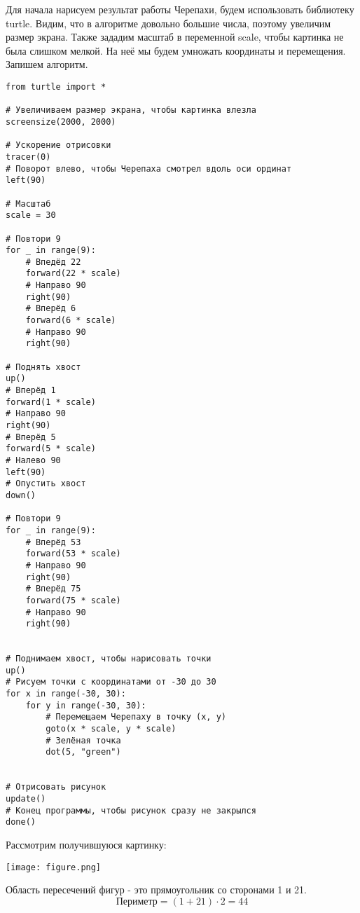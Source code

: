 \documentclass[14pt,a4paper]{article}
\begin{document}
Для начала нарисуем результат работы Черепахи, будем использовать
библиотеку turtle. Видим, что в алгоритме довольно большие числа,
поэтому увеличим размер экрана. Также зададим масштаб в переменной
scale, чтобы картинка не была слишком мелкой. На неё мы будем
умножать координаты и перемещения. Запишем алгоритм.

\begin{verbatim}
from turtle import *

# Увеличиваем размер экрана, чтобы картинка влезла
screensize(2000, 2000)

# Ускорение отрисовки
tracer(0)
# Поворот влево, чтобы Черепаха смотрел вдоль оси ординат
left(90)

# Масштаб
scale = 30

# Повтори 9
for _ in range(9):
    # Впедёд 22
    forward(22 * scale)
    # Направо 90
    right(90)
    # Вперёд 6
    forward(6 * scale)
    # Направо 90
    right(90)

# Поднять хвост
up()
# Вперёд 1
forward(1 * scale)
# Направо 90
right(90)
# Вперёд 5
forward(5 * scale)
# Налево 90
left(90)
# Опустить хвост
down()

# Повтори 9
for _ in range(9):
    # Вперёд 53
    forward(53 * scale)
    # Направо 90
    right(90)
    # Вперёд 75
    forward(75 * scale)
    # Направо 90
    right(90)


# Поднимаем хвост, чтобы нарисовать точки
up()
# Рисуем точки с координатами от -30 до 30
for x in range(-30, 30):
    for y in range(-30, 30):
        # Перемещаем Черепаху в точку (x, y)
        goto(x * scale, y * scale)
        # Зелёная точка
        dot(5, "green")


# Отрисовать рисунок
update()
# Конец программы, чтобы рисунок сразу не закрылся
done()
\end{verbatim}

Рассмотрим получившуюся картинку:

\begin{center}
    \texttt{[image: figure.png]}
\end{center}

Область пересечений фигур - это прямоугольник со сторонами 1 и 21.
\[\text{Периметр} = (1 + 21) \cdot 2 = 44\]
\end{document}
